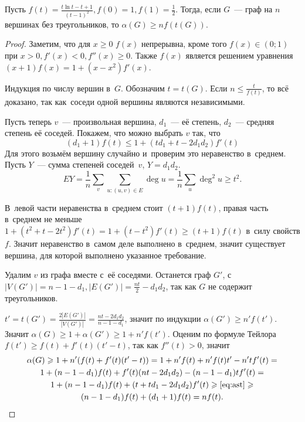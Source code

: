 \documentclass{article}
\begin{document}
\begin{theorem}
	Пусть $f(t) = \frac{t \ln t - t + 1}{(t-1)^2}, f(0) = 1, f(1) = \frac{1}{2}$.
	Тогда, если $G$~--- граф на $n$ вершинах без треугольников, то $\alpha(G) \ge
	n f(t(G))$.
\end{theorem}
\begin{proof}
	Заметим, что для $x \ge 0$ $f(x)$ непрерывна, кроме того $f(x) \in (0; 1)$ при
	$x > 0, f'(x) < 0, f''(x) \ge 0$. Также $f(x)$ является решением уравнения $(x
	+ 1) f(x) = 1 + (x - x^2)f'(x)$.

	Индукция по числу вершин в~$G$. Обозначим $t = t(G)$. Если $n \le
	\frac{t}{f(t)}$, то всё доказано, так как~соседи одной вершины являются
	независимыми.

	Пусть теперь $v$~--- произвольная вершина, $d_1$~--- её степень, $d_2$~---
	средняя степень её соседей. Покажем, что можно выбрать $v$ так, что
	\begin{equation}\tag{$\ast$}\label{eq:ast}
		(d_1 + 1)f(t) \le 1 + (td_1 + t - 2d_1d_2)f'(t)
	\end{equation}
	Для этого возьмём вершину случайно и~проверим это неравенство в~среднем.
	Пусть $Y$~--- сумма степеней соседей~$v$, $Y = d_1 d_2$.
	$$EY = \frac{1}{n} \sum\limits_v \sum\limits_{u: (u,v) \in E} \deg u =
	\frac{1}{n} \sum\limits_u \deg^2 u \ge t^2.$$

	В~левой части неравенства в~среднем стоит $(t+1)f(t)$, правая часть в~среднем
	не меньше $1 + (t^2 + t - 2t^2)f'(t) = 1 + (t - t^2)f'(t) \ge (t + 1) f(t)$
	в~силу свойств $f$. Значит неравенство в~самом деле выполнено в~среднем,
	значит существует вершина, для которой выполнено указанное требование.

	Удалим $v$ из графа вместе с~её соседями. Останется граф $G'$, с~$|V(G')| =
	n - 1 - d_1, |E(G')| = \frac{nt}{2} - d_1 d_2$, так как $G$ не содержит
	треугольников.

	$t' = t(G') = \frac{2|E(G')|}{|V(G')|} = \frac{nt -
	2d_1d_2}{n-1-d_1}$, значит по индукции $\alpha(G') \ge n' f(t')$. Значит
	$\alpha(G) \ge 1 + \alpha(G') \ge 1 + n' f(t')$. Оценим по формуле Тейлора
	$f(t') \ge f(t) + f'(t)(t' - t)$, так как $f''(t) > 0$, значит
	\begin{multline*}
		\alpha(G) \ge
		1 + n'(f(t) + f'(t)(t' - t)) = 1 + n'f(t) + n' f(t) t' - n' t f'(t) =\\
		1 + (n - 1 - d_1) f(t) + f'(t)(nt - 2d_1d_2) - (n - 1 - d_1)tf'(t) =\\
		1 + (n - 1 - d_1) f(t) + (t + td_1 - 2d_1d_2)f'(t) \ge \eqref{eq:ast} \ge\\
		(n - 1 - d_1) f(t) + (d_1 + 1) f(t) = n f(t).
	\end{multline*}
\end{proof}
\end{document}
